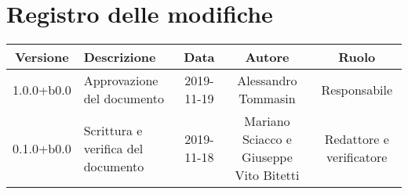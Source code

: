 \section*{Registro delle modifiche}

\begin{center}
	\begin{longtable}{|c|p{3cm}|c|c|c|}
	\hline
	\rowcolor{lighter-grayer}
	\textbf{Versione} & \textbf{Descrizione} & \textbf{Data} & \textbf{Autore} & \textbf{Ruolo} \\
	\hline
	\endfirsthead


	1.0.0+b0.0 & Approvazione del documento & 2019-11-19 & Alessandro Tommasin & Responsabile \\
	\hline
	0.1.0+b0.0 & Scrittura e verifica del documento & 2019-11-18 & Mariano Sciacco e Giuseppe Vito Bitetti & Redattore e verificatore \\

	\hline

	\end{longtable}
\end{center}
